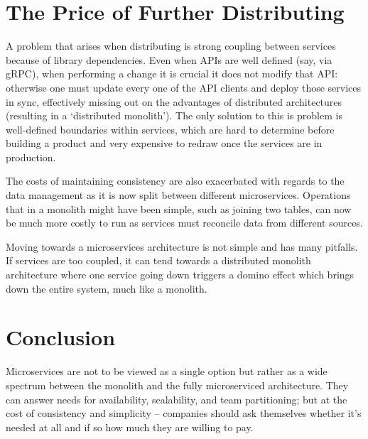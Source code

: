 \documentclass[conference]{IEEEtran}
\begin{document}
    \section{The Price of Further Distributing}

    A problem that arises when distributing is strong coupling between services because of library dependencies. Even when APIs are well defined (say, via gRPC), when performing a change it is crucial it does not modify that API: otherwise one must update every one of the API clients and deploy those services in sync, effectively missing out on the advantages of distributed architectures (resulting in a `distributed monolith').
    The only solution to this is problem is well-defined boundaries within services, which are hard to determine before building a product and very expensive to redraw once the services are in production.

    The costs of maintaining consistency are also exacerbated with regards to the data management as it is now split between different microservices.
    Operations that in a monolith might have been simple, such as joining two tables, can now be much more costly to run as services must reconcile data from different sources.

    Moving towards a microservices architecture is not simple and has many pitfalls.
    If services are too coupled, it can tend towards a distributed monolith architecture where one service going down triggers a domino effect which brings down the entire system, much like a monolith.


    \section{Conclusion}

    Microservices are not to be viewed as a single option but rather as a wide spectrum between the monolith and the fully microserviced architecture.
    They can answer needs for availability, scalability, and team partitioning;
    but at the cost of consistency and simplicity -- companies should ask themselves whether it's needed at all and if so how much they are willing to pay.

    \printbibliography
\end{document}
